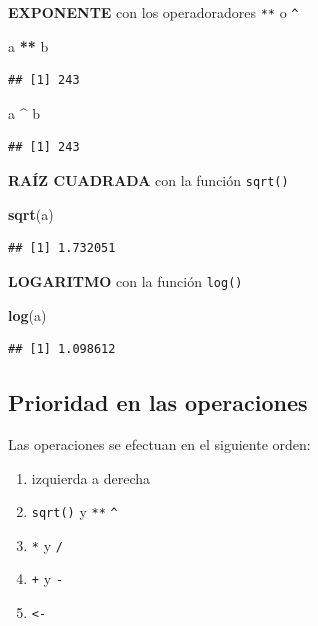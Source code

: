 \documentclass[
]{book}
\newenvironment{Shaded}{\begin{snugshade}}{\end{snugshade}}
\newcommand{\FunctionTok}[1]{\textcolor[rgb]{0.13,0.29,0.53}{\textbf{#1}}}
\newcommand{\NormalTok}[1]{#1}
\newcommand{\SpecialCharTok}[1]{\textcolor[rgb]{0.81,0.36,0.00}{\textbf{#1}}}
\providecommand{\tightlist}{%
  \setlength{\itemsep}{0pt}\setlength{\parskip}{0pt}}
\begin{document}
\textbf{EXPONENTE} con los operadoradores \texttt{**} o \texttt{\^{}}

\begin{Shaded}
\begin{Highlighting}[]
\NormalTok{a }\SpecialCharTok{**}\NormalTok{ b}
\end{Highlighting}
\end{Shaded}

\begin{verbatim}
## [1] 243
\end{verbatim}

\begin{Shaded}
\begin{Highlighting}[]
\NormalTok{a }\SpecialCharTok{\^{}}\NormalTok{ b}
\end{Highlighting}
\end{Shaded}

\begin{verbatim}
## [1] 243
\end{verbatim}

\textbf{RAÍZ CUADRADA} con la función \texttt{sqrt()}

\begin{Shaded}
\begin{Highlighting}[]
\FunctionTok{sqrt}\NormalTok{(a)}
\end{Highlighting}
\end{Shaded}

\begin{verbatim}
## [1] 1.732051
\end{verbatim}

\textbf{LOGARITMO} con la función \texttt{log()}

\begin{Shaded}
\begin{Highlighting}[]
\FunctionTok{log}\NormalTok{(a)}
\end{Highlighting}
\end{Shaded}

\begin{verbatim}
## [1] 1.098612
\end{verbatim}

\subsection{Prioridad en las operaciones}\label{prioridad-en-las-operaciones}

Las operaciones se efectuan en el siguiente orden:

\begin{enumerate}
\def\labelenumi{\arabic{enumi}.}
\tightlist
\item
  izquierda a derecha
\item
  \texttt{sqrt()} y \texttt{**} \texttt{\^{}}
\item
  \texttt{*} y \texttt{/}
\item
  \texttt{+} y \texttt{-}
\item
  \texttt{\textless{}-}
\end{enumerate}
\end{document}
